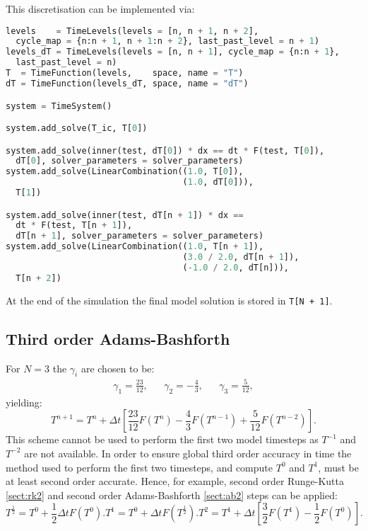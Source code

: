 \documentclass[a4paper]{book}
\begin{document}
This discretisation can be implemented via:
\begin{lstlisting}[language = python, frame = single, basicstyle=\footnotesize]
levels    = TimeLevels(levels = [n, n + 1, n + 2],
  cycle_map = {n:n + 1, n + 1:n + 2}, last_past_level = n + 1)
levels_dT = TimeLevels(levels = [n, n + 1], cycle_map = {n:n + 1},
  last_past_level = n)
T  = TimeFunction(levels,    space, name = "T")
dT = TimeFunction(levels_dT, space, name = "dT")

system = TimeSystem()

system.add_solve(T_ic, T[0])

system.add_solve(inner(test, dT[0]) * dx == dt * F(test, T[0]),
  dT[0], solver_parameters = solver_parameters)
system.add_solve(LinearCombination((1.0, T[0]),
                                   (1.0, dT[0])),
  T[1])

system.add_solve(inner(test, dT[n + 1]) * dx ==
  dt * F(test, T[n + 1]),
  dT[n + 1], solver_parameters = solver_parameters)
system.add_solve(LinearCombination((1.0, T[n + 1]),
                                   (3.0 / 2.0, dT[n + 1]),
                                   (-1.0 / 2.0, dT[n])),
  T[n + 2])
\end{lstlisting}
At the end of the simulation the final model solution is stored in
\verb=T[N + 1]=.

\subsection{Third order Adams-Bashforth}

For $N = 3$ the $\gamma_i$ are chosen to be:
\begin{align}
  \gamma_1 = \frac{23}{12}, & & \gamma_2 = -\frac{4}{3}, & & \gamma_3 = \frac{5}{12},
\end{align}
yielding:
\begin{equation}
  T^{n + 1} = T^n + \Delta t \left[ \frac{23}{12} F(T^n) - \frac{4}{3} F(T^{n - 1}) + \frac{5}{12} F(T^{n - 2}) \right].
\end{equation}
This scheme cannot be used to perform the first two model timesteps as $T^{-1}$
and $T^{-2}$ are not available. In order to ensure global third order accuracy
in time the method used to perform the first two timesteps, and compute $T^0$
and $T^1$, must be at least second order accurate. Hence, for example, second
order Runge-Kutta \ref{sect:rk2} and second order Adams-Bashforth \ref{sect:ab2}
steps can be applied:
\begin{subequations}
  \begin{equation}
    T^{\frac{1}{2}} = T^0 + \frac{1}{2} \Delta t F(T^0).
  \end{equation}
  \begin{equation}
    T^1 = T^0 + \Delta t F(T^{\frac{1}{2}}).
  \end{equation}
  \begin{equation}
    T^2 = T^1 + \Delta t \left[ \frac{3}{2} F(T^1) - \frac{1}{2} F(T^0) \right].
  \end{equation}
\end{subequations}
\end{document}
